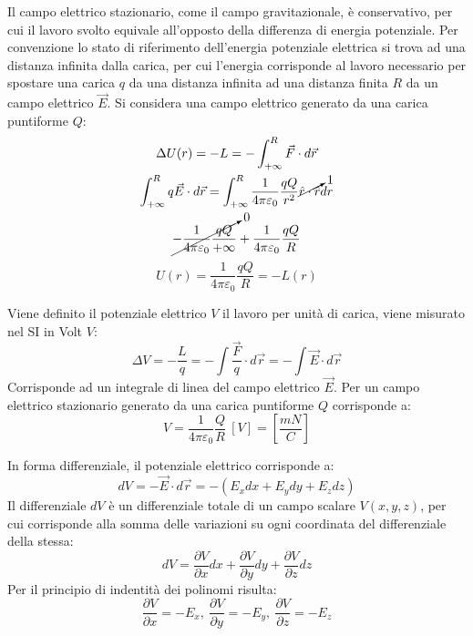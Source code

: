 \documentclass{article}
\numberwithin{equation}{subsection}
\begin{document}
Il campo elettrico stazionario, come il campo gravitazionale, è conservativo, per cui il lavoro svolto equivale all'opposto della differenza di energia potenziale. Per 
convenzione lo stato di riferimento dell'energia potenziale elettrica si trova ad una distanza infinita dalla carica, per cui l'energia corrisponde al lavoro necessario per 
spostare una carica $q$ da una distanza infinita ad una distanza finita $R$ da un campo elettrico $\vec{E}$. Si considera una campo elettrico generato da una carica puntiforme 
$Q$:
\begin{gather*}
    \Delta U(r)=-L=-\displaystyle\int_{+\infty}^R\vec{F}\cdot d\vec{r}\\
    \displaystyle\int_{+\infty}^Rq\vec{E}\cdot d\vec{r}=\int_{+\infty}^R\frac{1}{4\pi\varepsilon_0}\frac{qQ}{r^2}\cancelto{1}{\hat{r}\cdot \hat{r}}dr\\
    \cancelto{0}{-\displaystyle\frac{1}{4\pi\varepsilon_0}\frac{qQ}{+\infty}}+\frac{1}{4\pi\varepsilon_0}\frac{qQ}{R}
\end{gather*}
\begin{equation}
    U(r)=\frac{1}{4\pi\varepsilon_0}\frac{qQ}{R}=-L(r)
\end{equation}


Viene definito il potenziale elettrico $V$ il lavoro per unità di carica, viene misurato nel SI in Volt $V$:
\begin{equation}
    \Delta V=\displaystyle-\frac{L}{q}=-\int\frac{\vec{F}}{q}\cdot d\vec{r}=-\int\vec{E}\cdot d\vec{r}
\end{equation}
Corrisponde ad un integrale di linea del campo elettrico $\vec{E}$. 
Per un campo elettrico stazionario generato da una carica puntiforme $Q$ corrisponde a:
\begin{equation}
    V=\displaystyle\frac{1}{4\pi\varepsilon_0}\frac{Q}{R}\:\left[V\right]=\left[\frac{mN}{C}\right]
\end{equation}

In forma differenziale, il potenziale elettrico corrisponde a:
\begin{equation*}
    dV=-\vec{E}\cdot d\vec{r}=-(E_xdx+E_ydy+E_zdz)
\end{equation*}
Il differenziale $dV$ è un differenziale totale di un campo scalare $V(x,y,z)$, per cui corrisponde alla somma delle variazioni su ogni coordinata del differenziale della stessa: 
\begin{equation*}
    dV=\displaystyle\frac{\partial V}{\partial x}dx+\frac{\partial V}{\partial y}dy+\frac{\partial V}{\partial z}dz
\end{equation*}
Per il principio di indentità dei polinomi risulta:
\begin{equation*}
    \displaystyle\frac{\partial V}{\partial x}=-E_x,\:\frac{\partial V}{\partial y}=-E_y,\:\frac{\partial V}{\partial z}=-E_z
\end{equation*}
\end{document}
